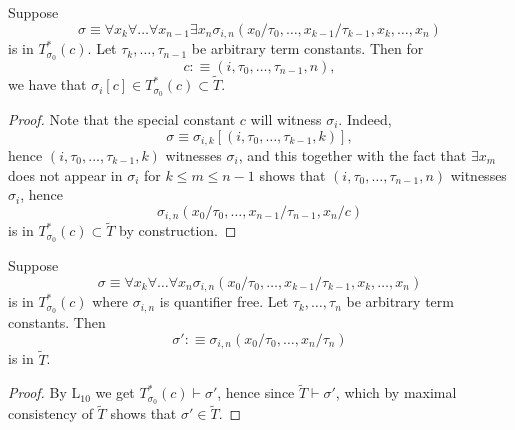 \begin{lemma}\label{LemmaForCase1InHenkinsProof}
    Suppose 
    $$
        \sigma\equiv \forall x_k\forall \dots\forall x_{n-1}\exists x_n\sigma_{i,n}(x_0/\tau_0,\dots,x_{k-1}/\tau_{k-1},x_k,\dots,x_n)
    $$
    is in $T_{\sigma_0}^\ast(c)$. Let $\tau_k,\dots,\tau_{n-1}$ be arbitrary term constants. Then for 
    $$
        c :\equiv (i,\tau_0,\dots,\tau_{n-1},n),
    $$
    we have that $\sigma_i[c]\in T^\ast_{\sigma_0}(c)\subset \widetilde{T}$.
\end{lemma}
\begin{proof}
Note that the special constant $c$ will witness $\sigma_i$. Indeed, 
$$
    \sigma \equiv \sigma_{i,k}[(i,\tau_0,\dots,\tau_{k-1},k)],
$$
hence $ (i,\tau_0,\dots,\tau_{k-1},k)$ witnesses $\sigma_i$, and this together with the fact that $\exists x_m$ does not appear in $\sigma_i$ for $k\leq m\leq n-1$ shows that $(i,\tau_0,\dots, \tau_{n-1},n)$ witnesses $\sigma_i$, hence 
$$
    \sigma_{i,n}(x_0/\tau_0,\dots,x_{n-1}/\tau_{n-1},x_n/c)
$$
is in $T_{\sigma_0}^\ast(c)\subset \widetilde{T}$ by construction.
\end{proof}
\begin{lemma}\label{LemmaForCase2InHenkinsProof}
    Suppose 
    $$
        \sigma\equiv \forall x_k\forall \dots\forall x_n\sigma_{i,n}(x_0/\tau_0,\dots,x_{k-1}/\tau_{k-1},x_k,\dots,x_n)
    $$
    is in $T_{\sigma_0}^\ast(c)$ where $\sigma_{i,n}$ is quantifier free. Let $\tau_k,\dots,\tau_n$ be arbitrary term constants. Then 
    $$
        \sigma' :\equiv \sigma_{i,n}(x_0/\tau_0,\dots,x_n/\tau_n)
    $$
    is in $\widetilde{T}$. 
\end{lemma}
\begin{proof}
    By $\mathrm{L}_{10}$ we get $T_{\sigma_0}^\ast(c)\vdash \sigma'$, hence since $\widetilde{T}\vdash \sigma'$, which by maximal consistency of $\widetilde{T}$ shows that $\sigma'\in \widetilde{T}$.
\end{proof}
